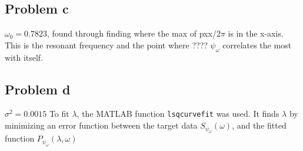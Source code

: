 \subsection{Problem c}

$\omega_0 = 0.7823$, found through finding where the max of pxx$/2\pi$ is in the x-axis. This is the resonant frequency and the point where ???? $\psi_\omega$ correlates the most with itself.

\subsection{Problem d}
$\sigma^2 = 0.0015$
To fit $\lambda$, the MATLAB function \texttt{lsqcurvefit} was used. It finds $\lambda$ by minimizing an error function between the target data $S_{\psi_\omega}(\omega)$, and the fitted function $P_{\psi_\omega}(\lambda, \omega)$